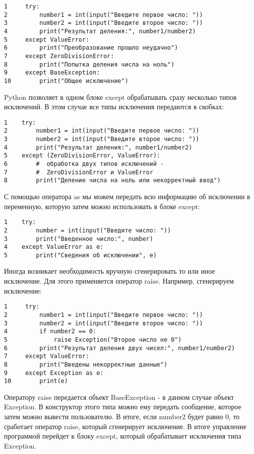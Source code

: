 \documentclass[12pt, a4paper]{article}
\begin{document}
\begin{verbatim}
1     try:
2         number1 = int(input("Введите первое число: "))
3         number2 = int(input("Введите второе число: "))
4         print("Результат деления:", number1/number2)
5     except ValueError:
6         print("Преобразование прошло неудачно")
7     except ZeroDivisionError:
8         print("Попытка деления числа на ноль")
9     except BaseException:
10        print("Общее исключение")
\end{verbatim}

Python позволяет в одном блоке except обрабатывать сразу несколько типов исключений. В этом случае все типы исключения передаются в скобках:

\begin{verbatim}
1    try:
2        number1 = int(input("Введите первое число: "))
3        number2 = int(input("Введите второе число: "))
4        print("Результат деления:", number1/number2)
5    except (ZeroDivisionError, ValueError):    
6        #  обработка двух типов исключений - 
7        #  ZeroDivisionError и ValueError
8        print("Деление числа на ноль или некорректный ввод")
\end{verbatim}

С помощью оператора as мы можем передать всю информацию об исключении в переменную, которую затем можно использовать в блоке except:

\begin{verbatim}
1    try:
2        number = int(input("Введите число: "))
3        print("Введенное число:", number)
4    except ValueError as e:
5        print("Сведения об исключении", e)
\end{verbatim}

\newpage

Иногда возникает необходимость вручную сгенерировать то или иное исключение. Для этого применяется оператор raise. Например, сгенерируем исключение:

\begin{verbatim}
1     try:
2         number1 = int(input("Введите первое число: "))
3         number2 = int(input("Введите второе число: "))
4         if number2 == 0:
5             raise Exception("Второе число не 0")
6         print("Результат деления двух чисел:", number1/number2)
7     except ValueError:
8         print("Введены некорректные данные")
9     except Exception as e:
10        print(e)
\end{verbatim}

Оператору raise передается объект BaseException - в данном случае объект Exception. В конструктор этого типа можно ему передать сообщение, которое затем можно вывести пользователю. В итоге, если number2 будет равно 0, то сработает оператор raise, который сгенерирует исключение. В итоге управление программой перейдет к блоку except, который обрабатывает исключения типа Exception.
\end{document}
